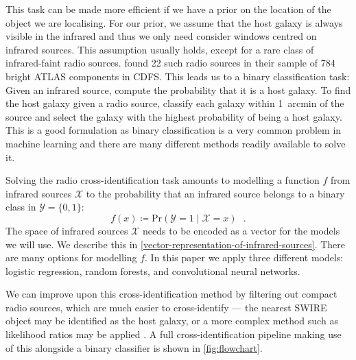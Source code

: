\documentclass[fleqn,usenatbib,usedcolumn]{mnras}
\begin{document}
    This task can be made more efficient if we have a prior on the location of
    the object we are localising. For our prior, we assume that the host galaxy
    is always visible in the infrared and thus we only need consider windows
    centred on infrared sources. This assumption usually holds, except for a
    rare class of infrared-faint radio sources. \citet{norris06} found 22 such
    radio sources in their sample of 784 bright ATLAS components in CDFS. This
    leads us to a binary classification task: Given an infrared source, compute
    the probability that it is a host galaxy. To find the host galaxy given a
    radio source, classify each galaxy within 1~arcmin of the source and select
    the galaxy with the highest probability of being a host galaxy. This is a
    good formulation as binary classification is a very common problem in
    machine learning and there are many different methods readily available to
    solve it.

    Solving the radio cross-identification task amounts to modelling a function
    $f$ from infrared sources $\mathcal{X}$ to the probability that an infrared
    source belongs to a binary class in $\mathcal{Y} = \{0, 1\}$:
    \begin{equation}
        f(x) \coloneqq \text{Pr}\left(\mathcal{Y} = 1 \mid \mathcal X = x\right)\,\,\,\,.
    \end{equation}
    The space of infrared sources $\mathcal{X}$ needs to be encoded as a vector
    for the models we will use. We describe this in
    \autoref{vector-representation-of-infrared-sources}. There are many options
    for modelling $f$. In this paper we apply three different models: logistic
    regression, random forests, and convolutional neural networks.

    We can improve upon this cross-identification method by filtering out
    compact radio sources, which are much easier to cross-identify --- the
    nearest SWIRE object may be identified as the host galaxy, or a more
    complex method such as likelihood ratios may be applied
    \citep[see][]{weston17}. A full cross-identification pipeline making use
    of this alongside a binary classifier is shown in \autoref{fig:flowchart}.
\end{document}
